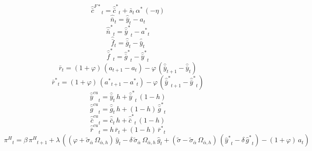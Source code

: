 \begin{dmath}
{{\hat {\bar c}^{F*}}}_{t}={{\hat {\bar c}^*}}_{t}+{{\bar s}}_{t}\, {{\alpha^*}}\, \left(-{{\eta}}\right)
\end{dmath}
\begin{dmath}
{{\hat {\bar n}}}_{t}={{\hat {\bar y}}}_{t}-{{a}}_{t}
\end{dmath}
\begin{dmath}
{{\hat {\bar n}^*}}_{t}={{\hat {\bar y}^*}}_{t}-{{a^*}}_{t}
\end{dmath}
\begin{dmath}
{{\hat {\bar f}}}_{t}={{\hat {\bar g}}}_{t}-{{\hat {\bar y}}}_{t}
\end{dmath}
\begin{dmath}
{{\hat {\bar f}^*}}_{t}={{\hat {\bar g}^*}}_{t}-{{\hat {\bar y}^*}}_{t}
\end{dmath}
\begin{dmath}
{{\bar r}}_{t}=\left(1+{{\varphi}}\right)\, \left({{a}}_{t+1}-{{a}}_{t}\right)-{{\varphi}}\, \left({{\hat {\bar y}}}_{t+1}-{{\hat {\bar y}}}_{t}\right)
\end{dmath}
\begin{dmath}
{{\bar r^*}}_{t}=\left(1+{{\varphi}}\right)\, \left({{a^*}}_{t+1}-{{a^*}}_{t}\right)-{{\varphi}}\, \left({{\hat {\bar y}^*}}_{t+1}-{{\hat {\bar y}^*}}_{t}\right)
\end{dmath}
\begin{dmath}
{{\hat {\bar y}^{cu}}}_{t}={{\hat {\bar y}}}_{t}\, {{h}}+{{\hat {\bar y}^*}}_{t}\, \left(1-{{h}}\right)
\end{dmath}
\begin{dmath}
{{\hat {\bar g}^{cu}}}_{t}={{\hat {\bar g}}}_{t}\, {{h}}+\left(1-{{h}}\right)\, {{\hat {\bar g}^*}}_{t}
\end{dmath}
\begin{dmath}
{{\hat {\bar c}^{cu}}}_{t}={{\hat {\bar c}}}_{t}\, {{h}}+{{\hat {\bar c}^*}}_{t}\, \left(1-{{h}}\right)
\end{dmath}
\begin{dmath}
{{\hat {\bar r}^{cu}}}_{t}={{h}}\, {{\bar r}}_{t}+\left(1-{{h}}\right)\, {{\bar r^*}}_{t}
\end{dmath}
\begin{dmath}
{{\pi^H}}_{t}={{\beta}}\, {{\pi^H}}_{t+1}+{{\lambda}}\, \left(\left({{\varphi}}+{{\tilde\sigma_{\bar{\alpha}}}}\, {{\Omega_{\bar \alpha,h}}}\right)\, {{\hat y}}_{t}-{{\delta}}\, {{\tilde\sigma_{\bar{\alpha}}}}\, {{\Omega_{\bar \alpha,h}}}\, {{\hat g}}_{t}+\left({{\tilde{\sigma}}}-{{\tilde\sigma_{\bar{\alpha}}}}\, {{\Omega_{\bar \alpha,h}}}\right)\, \left({{\hat y^*}}_{t}-{{\delta}}\, {{\hat g^*}}_{t}\right)-\left(1+{{\varphi}}\right)\, {{a}}_{t}\right)
\end{dmath}
